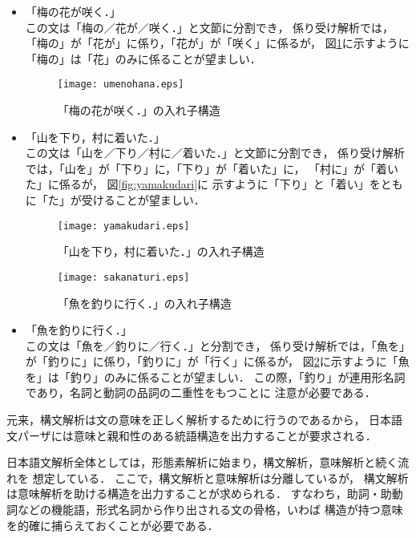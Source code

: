 \documentclass[japanese]{jnlp_1.2}
\begin{document}
\begin{itemize}
\item 「梅の花が咲く．」\\
  この文は「梅の／花が／咲く．」と文節に分割でき，
  係り受け解析では，「梅の」が「花が」に係り，「花が」が「咲く」に係るが，
  図\ref{fig:umenohana}に示すように「梅の」は「花」のみに係ることが望ましい．
\begin{figure}[b]
  \centering
      \texttt{[image: umenohana.eps]}
  \caption{「梅の花が咲く．」の入れ子構造} \label{fig:umenohana}
\end{figure}

\item 「山を下り，村に着いた．」\\
  この文は「山を／下り／村に／着いた．」と文節に分割でき，
  係り受け解析では，「山を」が「下り」に，「下り」が「着いた」に，
  「村に」が「着いた」に係るが，
  図\ref{fig:yamakudari}に
  示すように「下り」と「着い」をともに「た」が受けることが望ましい．

\begin{figure}[t]
  \centering
      \texttt{[image: yamakudari.eps]}
  \caption{「山を下り，村に着いた．」の入れ子構造} \label{fig:yamakudari}
    \par\vspace{20pt}
      \texttt{[image: sakanaturi.eps]}
  \caption{「魚を釣りに行く．」の入れ子構造} \label{fig:sakanaturi}
\end{figure}


\item 「魚を釣りに行く．」\\
  この文は「魚を／釣りに／行く．」と分割でき，
  係り受け解析では，「魚を」が「釣りに」に係り，「釣りに」が「行く」に係るが，
  図\ref{fig:sakanaturi}に示すように「魚を」は「釣り」のみに係ることが望ましい．
  この際，「釣り」が連用形名詞であり，名詞と動詞の品詞の二重性をもつことに
  注意が必要である．
\end{itemize}

元来，構文解析は文の意味を正しく解析するために行うのであるから，
日本語文パーザには意味と親和性のある統語構造を出力することが要求される．

日本語文解析全体としては，形態素解析に始まり，構文解析，意味解析と続く流れを
想定している．
ここで，構文解析と意味解析は分離しているが，
構文解析は意味解析を助ける構造を出力することが求められる．
すなわち，助詞・助動詞などの機能語，形式名詞から作り出される文の骨格，いわば
構造が持つ意味を的確に捕らえておくことが必要である．
\end{document}
